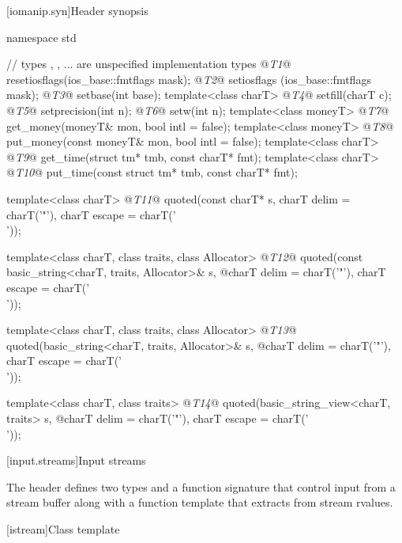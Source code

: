 %
%
%
%

[iomanip.syn]{Header  synopsis}

%
\begin{codeblock}
namespace std {
  // types , , ... are unspecified implementation types
  @\textit{T1}@ resetiosflags(ios_base::fmtflags mask);
  @\textit{T2}@ setiosflags  (ios_base::fmtflags mask);
  @\textit{T3}@ setbase(int base);
  template<class charT> @\textit{T4}@ setfill(charT c);
  @\textit{T5}@ setprecision(int n);
  @\textit{T6}@ setw(int n);
  template<class moneyT> @\textit{T7}@ get_money(moneyT& mon, bool intl = false);
  template<class moneyT> @\textit{T8}@ put_money(const moneyT& mon, bool intl = false);
  template<class charT> @\textit{T9}@ get_time(struct tm* tmb, const charT* fmt);
  template<class charT> @\textit{T10}@ put_time(const struct tm* tmb, const charT* fmt);

  template<class charT>
    @\textit{T11}@ quoted(const charT* s, charT delim = charT('"'), charT escape = charT('\\'));

  template<class charT, class traits, class Allocator>
    @\textit{T12}@ quoted(const basic_string<charT, traits, Allocator>& s,
    @\itcorr@           charT delim = charT('"'), charT escape = charT('\\'));

  template<class charT, class traits, class Allocator>
    @\textit{T13}@ quoted(basic_string<charT, traits, Allocator>& s,
    @\itcorr@           charT delim = charT('"'), charT escape = charT('\\'));

  template<class charT, class traits>
    @\textit{T14}@ quoted(basic_string_view<charT, traits> s,
    @\itcorr@           charT delim = charT('"'), charT escape = charT('\\'));
}
\end{codeblock}

[input.streams]{Input streams}

\pnum
The header  defines two types
and a function signature that control input from a stream buffer along with a function template that extracts from stream rvalues.

[istream]{Class template }

